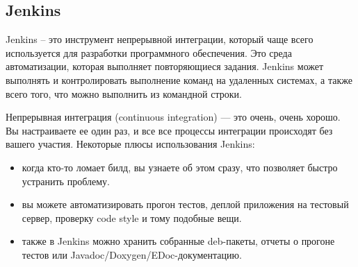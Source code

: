 \subsection{Jenkins}
\label{sec:analysis:jenkins}

Jenkins – это инструмент непрерывной интеграции, который чаще всего используется для разработки программного обеспечения. Это среда автоматизации, которая выполняет повторяющиеся задания. Jenkins может выполнять и контролировать выполнение команд на удаленных системах, а также всего того, что можно выполнить из командной строки. 

Непрерывная интеграция (continuous integration) — это очень, очень хорошо. Вы настраиваете ее один раз, и все все процессы интеграции происходят без вашего участия. Некоторые плюсы использования Jenkins:
\begin{itemize}
  \item когда кто-то ломает билд, вы узнаете об этом сразу, что позволяет быстро устранить проблему.
  \item вы можете автоматизировать прогон тестов, деплой приложения на тестовый сервер, проверку code style и тому подобные вещи.
  \item также в Jenkins можно хранить собранные deb-пакеты, отчеты о прогоне тестов или Javadoc/Doxygen/EDoc-документацию. 
\end{itemize}
